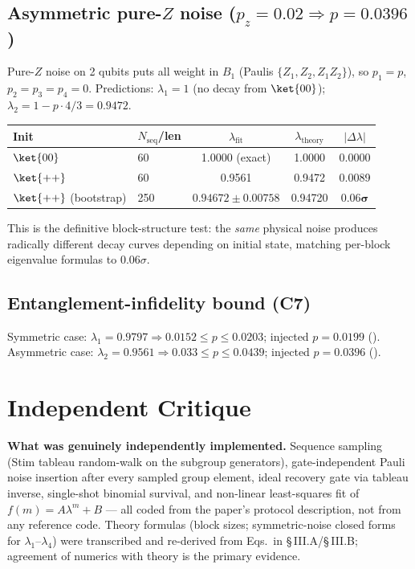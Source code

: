 \documentclass[11pt]{article}
\begin{document}
\subsection{Asymmetric pure-$Z$ noise ($p_z=0.02 \Rightarrow p=0.0396$)}
Pure-$Z$ noise on 2 qubits puts all weight in $B_1$ (Paulis $\{Z_1, Z_2, Z_1Z_2\}$),
so $p_1 = p$, $p_2 = p_3 = p_4 = 0$. Predictions:
$\lambda_1 = 1$ (no decay from $\ket{00}$); $\lambda_2 = 1 - p\cdot 4/3 = 0.9472$.
\begin{center}
\begin{tabular}{llccc}
\toprule
Init & $N_{\mathrm{seq}}$/len & $\lambda_{\mathrm{fit}}$ & $\lambda_{\mathrm{theory}}$ & $|\Delta\lambda|$ \\
\midrule
$\ket{00}$ & 60  & 1.0000 (exact) & 1.0000 & 0.0000 \\
$\ket{++}$ & 60  & 0.9561         & 0.9472 & 0.0089 \\
$\ket{++}$ (bootstrap) & 250 & $0.94672 \pm 0.00758$ & 0.94720 & $\mathbf{0.06\sigma}$ \\
\bottomrule
\end{tabular}
\end{center}
This is the definitive block-structure test: the \emph{same} physical noise
produces radically different decay curves depending on initial state, matching
per-block eigenvalue formulas to $0.06\sigma$.

\subsection{Entanglement-infidelity bound (C7)}
Symmetric case: $\lambda_1=0.9797 \Rightarrow 0.0152 \le p \le 0.0203$;
injected $p=0.0199$ (\checkmark). Asymmetric case: $\lambda_2=0.9561 \Rightarrow
0.033 \le p \le 0.0439$; injected $p=0.0396$ (\checkmark).

\section{Independent Critique}

\textbf{What was genuinely independently implemented.}
Sequence sampling (Stim tableau random-walk on the subgroup generators),
gate-independent Pauli noise insertion after every sampled group element,
ideal recovery gate via tableau inverse, single-shot binomial survival, and
non-linear least-squares fit of $f(m) = A\lambda^m + B$ --- all coded from the
paper's protocol description, not from any reference code. Theory formulas
(block sizes; symmetric-noise closed forms for $\lambda_1$--$\lambda_4$)
were transcribed and re-derived from Eqs.\ in \S\,III.A/\S\,III.B; agreement
of numerics with theory is the primary evidence.
\end{document}
